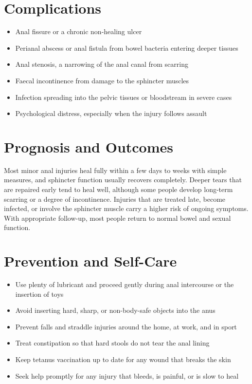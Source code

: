 \section*{Complications}
\begin{itemize}
    \item Anal fissure or a chronic non-healing ulcer
    \item Perianal abscess or anal fistula from bowel bacteria entering deeper tissues
    \item Anal stenosis, a narrowing of the anal canal from scarring
    \item Faecal incontinence from damage to the sphincter muscles
    \item Infection spreading into the pelvic tissues or bloodstream in severe cases
    \item Psychological distress, especially when the injury follows assault
\end{itemize}

\section*{Prognosis and Outcomes}
Most minor anal injuries heal fully within a few days to weeks with simple measures, and sphincter function usually recovers completely. Deeper tears that are repaired early tend to heal well, although some people develop long-term scarring or a degree of incontinence. Injuries that are treated late, become infected, or involve the sphincter muscle carry a higher risk of ongoing symptoms. With appropriate follow-up, most people return to normal bowel and sexual function.

\section*{Prevention and Self-Care}
\begin{itemize}
    \item Use plenty of lubricant and proceed gently during anal intercourse or the insertion of toys
    \item Avoid inserting hard, sharp, or non-body-safe objects into the anus
    \item Prevent falls and straddle injuries around the home, at work, and in sport
    \item Treat constipation so that hard stools do not tear the anal lining
    \item Keep tetanus vaccination up to date for any wound that breaks the skin
    \item Seek help promptly for any injury that bleeds, is painful, or is slow to heal
\end{itemize}

